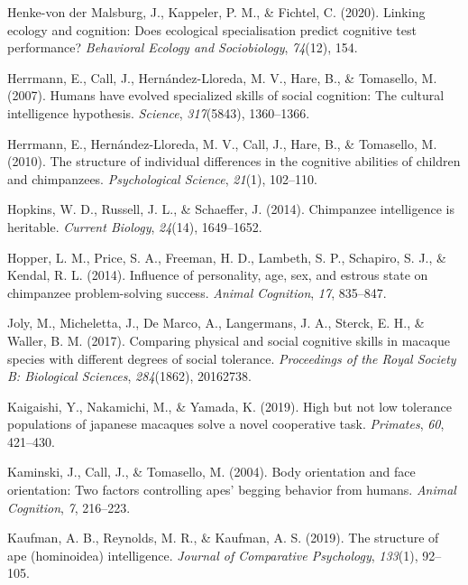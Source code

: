 \documentclass[
  man,floatsintext]{apa6}
\newlength{\cslhangindent}
\newenvironment{CSLReferences}[2] %
 {\begin{list}{}{%
  \setlength{\itemindent}{0pt}
  \setlength{\leftmargin}{0pt}
  \setlength{\parsep}{0pt}
  \ifodd #1
   \setlength{\leftmargin}{\cslhangindent}
   \setlength{\itemindent}{-1\cslhangindent}
  \fi
  \setlength{\itemsep}{#2\baselineskip}}}
 {\end{list}}
\begin{document}
\begin{CSLReferences}{1}{0}
Henke-von der Malsburg, J., Kappeler, P. M., \& Fichtel, C. (2020). Linking ecology and cognition: Does ecological specialisation predict cognitive test performance? \emph{Behavioral Ecology and Sociobiology}, \emph{74}(12), 154.

Herrmann, E., Call, J., Hernández-Lloreda, M. V., Hare, B., \& Tomasello, M. (2007). Humans have evolved specialized skills of social cognition: The cultural intelligence hypothesis. \emph{Science}, \emph{317}(5843), 1360--1366.

Herrmann, E., Hernández-Lloreda, M. V., Call, J., Hare, B., \& Tomasello, M. (2010). The structure of individual differences in the cognitive abilities of children and chimpanzees. \emph{Psychological Science}, \emph{21}(1), 102--110.

Hopkins, W. D., Russell, J. L., \& Schaeffer, J. (2014). Chimpanzee intelligence is heritable. \emph{Current Biology}, \emph{24}(14), 1649--1652.

Hopper, L. M., Price, S. A., Freeman, H. D., Lambeth, S. P., Schapiro, S. J., \& Kendal, R. L. (2014). Influence of personality, age, sex, and estrous state on chimpanzee problem-solving success. \emph{Animal Cognition}, \emph{17}, 835--847.

Joly, M., Micheletta, J., De Marco, A., Langermans, J. A., Sterck, E. H., \& Waller, B. M. (2017). Comparing physical and social cognitive skills in macaque species with different degrees of social tolerance. \emph{Proceedings of the Royal Society B: Biological Sciences}, \emph{284}(1862), 20162738.

Kaigaishi, Y., Nakamichi, M., \& Yamada, K. (2019). High but not low tolerance populations of japanese macaques solve a novel cooperative task. \emph{Primates}, \emph{60}, 421--430.

Kaminski, J., Call, J., \& Tomasello, M. (2004). Body orientation and face orientation: Two factors controlling apes' begging behavior from humans. \emph{Animal Cognition}, \emph{7}, 216--223.

Kaufman, A. B., Reynolds, M. R., \& Kaufman, A. S. (2019). The structure of ape (hominoidea) intelligence. \emph{Journal of Comparative Psychology}, \emph{133}(1), 92--105.


\end{CSLReferences}
\end{document}
